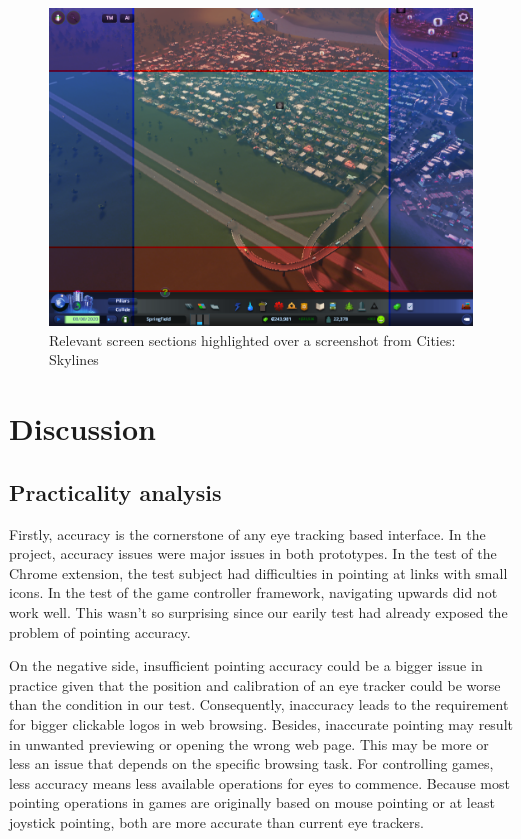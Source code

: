 \documentclass[english]{tktltiki}
\begin{document}
\begin{figure}[h]
\begin{center}
\includegraphics[width=1\textwidth]{cities_skylines.png}
\caption{Relevant screen sections highlighted over a screenshot from Cities: Skylines}
\label{citiesskylines}
\end{center}
\end{figure}



\section{Discussion}

\subsection{Practicality analysis}

Firstly, accuracy is the cornerstone of any eye tracking based interface. In the project, accuracy issues were major issues in both prototypes. In the test of the Chrome extension, the test subject had difficulties in pointing at links with small icons. In the test of the game controller framework, navigating upwards did not work well. This wasn't so surprising since our earily test had already exposed the problem of pointing accuracy. 

On the negative side, insufficient pointing accuracy could be a bigger issue in practice given that the position and calibration of an eye tracker could be worse than the condition in our test. Consequently, inaccuracy leads to the requirement for bigger clickable logos in web browsing. Besides, inaccurate pointing may result in unwanted previewing or opening the wrong web page. This may be more or less an issue that depends on the specific browsing task. For controlling games, less accuracy means less available operations for eyes to commence. Because most pointing operations in games are originally based on mouse pointing or at least joystick pointing, both are more accurate than current eye trackers.
\end{document}
